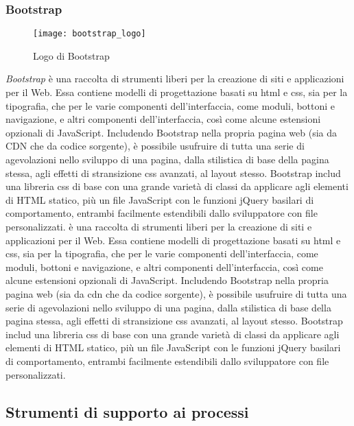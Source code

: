 \subsubsection{Bootstrap}
\begin{figure}[htb] 
    \centering 
    \texttt{[image: bootstrap\_logo]} 
    \caption{Logo di Bootstrap}
\end{figure}
\emph{Bootstrap} è una raccolta di strumenti liberi per la creazione di siti e applicazioni per il Web. Essa contiene modelli di progettazione basati su \gls{html} e \gls{css}, sia per la tipografia, che per le varie componenti dell'interfaccia, come moduli, bottoni e navigazione, e altri componenti dell'interfaccia, così come alcune estensioni opzionali di JavaScript.
Includendo Bootstrap nella propria pagina web (sia da CDN che da codice sorgente), è possibile usufruire di tutta una serie di agevolazioni nello sviluppo di una pagina, dalla stilistica di base della pagina stessa, agli effetti di stransizione \gls{css} avanzati, al layout stesso. 
Bootstrap includ una libreria \gls{css} di base con una grande varietà di classi da applicare agli elementi di HTML statico, più un file JavaScript con le funzioni jQuery basilari di comportamento, entrambi facilmente estendibili dallo sviluppatore con file personalizzati. è una raccolta di strumenti liberi per la creazione di siti e applicazioni per il Web. Essa contiene modelli di progettazione basati su \gls{html} e \gls{css}, sia per la tipografia, che per le varie componenti dell'interfaccia, come moduli, bottoni e navigazione, e altri componenti dell'interfaccia, così come alcune estensioni opzionali di JavaScript.
Includendo Bootstrap nella propria pagina web (sia da \gls{cdn} che da codice sorgente), è possibile usufruire di tutta una serie di agevolazioni nello sviluppo di una pagina, dalla stilistica di base della pagina stessa, agli effetti di stransizione \gls{css} avanzati, al layout stesso. 
Bootstrap includ una libreria \gls{css} di base con una grande varietà di classi da applicare agli elementi di HTML statico, più un file JavaScript con le funzioni jQuery basilari di comportamento, entrambi facilmente estendibili dallo sviluppatore con file personalizzati.

\subsection{Strumenti di supporto ai processi}
